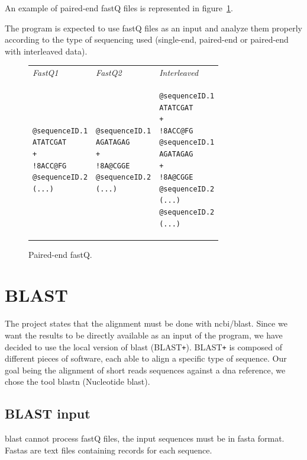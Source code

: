 An example of paired-end fastQ files is represented in figure~\ref{fig:pairedFastq}.

The program is expected to use fastQ files as an input and analyze them properly according to the type of sequencing used (single-end, paired-end or paired-end with interleaved data).

\begin{figure}[H]
\lstset{
    basicstyle=\ttfamily\small,
    frameround=ftft,
    frame=trBL}
\begin{tabular}{P P || P}
\emph{FastQ1} & \emph{FastQ2} & \emph{Interleaved}\tabularnewline{}
\begin{minipage}[t]{0.2\textwidth}
\begin{lstlisting}
@sequenceID.1
ATATCGAT
+
!8ACC@FG
@sequenceID.2
(...)
\end{lstlisting}
\end{minipage}
&
\begin{minipage}[t]{0.2\textwidth}
\begin{lstlisting}
@sequenceID.1
AGATAGAG
+
!8A@CGGE
@sequenceID.2
(...)
\end{lstlisting}
\end{minipage}
&
\begin{minipage}[t]{0.2\textwidth}
\begin{lstlisting}
@sequenceID.1
ATATCGAT
+
!8ACC@FG
@sequenceID.1
AGATAGAG
+
!8A@CGGE
@sequenceID.2
(...)
@sequenceID.2
(...)
\end{lstlisting}
\end{minipage}
\end{tabular}
\caption{Paired-end fastQ.}\label{fig:pairedFastq}
\end{figure}


\section{BLAST}
The project states that the alignment must be done with \gls{ncbi}\slash\gls{blast}.
Since we want the results to be directly available as an input of the program, we have decided to use the local version of \gls{blast} (BLAST\texttt{+}).
BLAST\texttt{+} is composed of different pieces of software, each able to align a specific type of sequence.
Our goal being the alignment of short reads sequences against a \gls{dna} reference, we chose the tool blastn (Nucleotide \gls{blast}).


\subsection{BLAST input}\label{subsec:blastinput}
\gls{blast} cannot process fastQ files, the input sequences must be in fasta format.
Fastas are text files containing records for each sequence.

